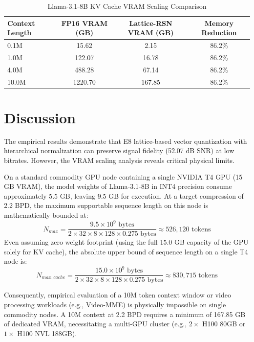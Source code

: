 \documentclass[journal,onecolumn,12pt]{IEEEtran}
\begin{document}
\begin{table}[h]
\centering
\caption{Llama-3.1-8B KV Cache VRAM Scaling Comparison}
\label{tab:vram_scaling}
\begin{tabular}{lccc}
\toprule
\textbf{Context Length} & \textbf{FP16 VRAM (GB)} & \textbf{Lattice-RSN VRAM (GB)} & \textbf{Memory Reduction} \\
\midrule
0.1M & 15.62 & 2.15 & 86.2\% \\
1.0M & 122.07 & 16.78 & 86.2\% \\
4.0M & 488.28 & 67.14 & 86.2\% \\
10.0M & 1220.70 & 167.85 & 86.2\% \\
\bottomrule
\end{tabular}
\end{table}

\section{Discussion}
The empirical results demonstrate that E8 lattice-based vector quantization with hierarchical normalization can preserve signal fidelity (52.07 dB SNR) at low bitrates. However, the VRAM scaling analysis reveals critical physical limits.

On a standard commodity GPU node containing a single NVIDIA T4 GPU (15 GB VRAM), the model weights of Llama-3.1-8B in INT4 precision consume approximately 5.5 GB, leaving 9.5 GB for execution. At a target compression of 2.2 BPD, the maximum supportable sequence length on this node is mathematically bounded at:
\begin{equation}
    N_{max} = \frac{9.5 \times 10^9 \text{ bytes}}{2 \times 32 \times 8 \times 128 \times 0.275 \text{ bytes}} \approx 526,120 \text{ tokens}
\end{equation}
Even assuming zero weight footprint (using the full 15.0 GB capacity of the GPU solely for KV cache), the absolute upper bound of sequence length on a single T4 node is:
\begin{equation}
    N_{max, cache} = \frac{15.0 \times 10^9 \text{ bytes}}{2 \times 32 \times 8 \times 128 \times 0.275 \text{ bytes}} \approx 830,715 \text{ tokens}
\end{equation}

Consequently, empirical evaluation of a 10M token context window or video processing workloads (e.g., Video-MME) is physically impossible on single commodity nodes. A 10M context at 2.2 BPD requires a minimum of 167.85 GB of dedicated VRAM, necessitating a multi-GPU cluster (e.g., $2 \times$ H100 80GB or $1 \times$ H100 NVL 188GB).
\end{document}
